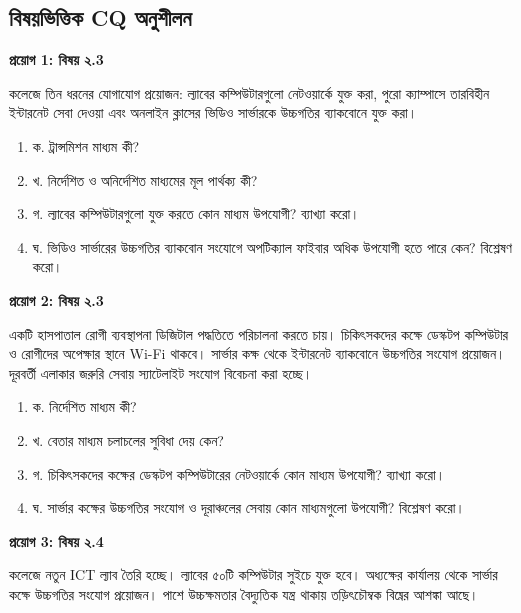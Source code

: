 \subsection{বিষয়ভিত্তিক CQ অনুশীলন}
\par{}
\textbf{প্রয়োগ 1: বিষয় ২.3}\par
\par
কলেজে তিন ধরনের যোগাযোগ প্রয়োজন: ল্যাবের কম্পিউটারগুলো নেটওয়ার্কে যুক্ত করা, পুরো ক্যাম্পাসে তারবিহীন ইন্টারনেট সেবা দেওয়া এবং অনলাইন ক্লাসের ভিডিও সার্ভারকে উচ্চগতির ব্যাকবোনে যুক্ত করা।

\begin{enumerate}
\item ক. ট্রান্সমিশন মাধ্যম কী?
\item খ. নির্দেশিত ও অনির্দেশিত মাধ্যমের মূল পার্থক্য কী?
\item গ. ল্যাবের কম্পিউটারগুলো যুক্ত করতে কোন মাধ্যম উপযোগী? ব্যাখ্যা করো।
\item ঘ. ভিডিও সার্ভারের উচ্চগতির ব্যাকবোন সংযোগে অপটিক্যাল ফাইবার অধিক উপযোগী হতে পারে কেন? বিশ্লেষণ করো।
\end{enumerate}
\par

\par{}
\textbf{প্রয়োগ 2: বিষয় ২.3}\par
একটি হাসপাতাল রোগী ব্যবস্থাপনা ডিজিটাল পদ্ধতিতে পরিচালনা করতে চায়। চিকিৎসকদের কক্ষে ডেস্কটপ কম্পিউটার ও রোগীদের অপেক্ষার স্থানে Wi-Fi থাকবে। সার্ভার কক্ষ থেকে ইন্টারনেট ব্যাকবোনে উচ্চগতির সংযোগ প্রয়োজন। দূরবর্তী এলাকার জরুরি সেবায় স্যাটেলাইট সংযোগ বিবেচনা করা হচ্ছে।

\begin{enumerate}
\item ক. নির্দেশিত মাধ্যম কী?
\item খ. বেতার মাধ্যম চলাচলের সুবিধা দেয় কেন?
\item গ. চিকিৎসকদের কক্ষের ডেস্কটপ কম্পিউটারের নেটওয়ার্কে কোন মাধ্যম উপযোগী? ব্যাখ্যা করো।
\item ঘ. সার্ভার কক্ষের উচ্চগতির সংযোগ ও দূরাঞ্চলের সেবায় কোন মাধ্যমগুলো উপযোগী? বিশ্লেষণ করো।
\end{enumerate}
\par

\par{}
\textbf{প্রয়োগ 3: বিষয় ২.4}\par
\par
কলেজে নতুন ICT ল্যাব তৈরি হচ্ছে। ল্যাবের ৫০টি কম্পিউটার সুইচে যুক্ত হবে। অধ্যক্ষের কার্যালয় থেকে সার্ভার কক্ষে উচ্চগতির সংযোগ প্রয়োজন। পাশে উচ্চক্ষমতার বৈদ্যুতিক যন্ত্র থাকায় তড়িৎচৌম্বক বিঘ্নের আশঙ্কা আছে।

